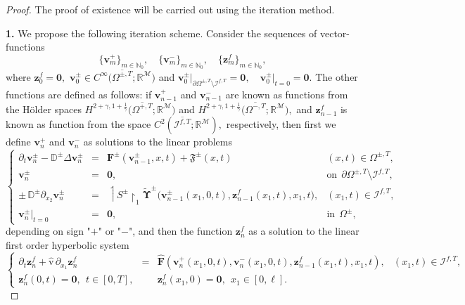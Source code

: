 \documentclass[reqno]{amsart}            %
\numberwithin{equation}{section}
\begin{document}
	
	\begin{proof}
		The proof of existence will be carried out using the iteration method.
		
		{\bf 1.} We propose the following iteration scheme. Consider the sequences of vector-functions
		\begin{equation}\label{sequences}
			\{\mathbf{v}^+_m\}_{m\in \mathbb N_0}, \quad \{\mathbf{v}^-_m\}_{m\in \mathbb N_0}, \quad \{\mathbf{z}^f_m\}_{m\in \mathbb N_0}, 
		\end{equation}   
		where $\mathbf{z}^f_0 = \mathbf{0},$ $\mathbf{v}^\pm_0 \in C^\infty\big(\overline{\Omega^{\pm, T}}; \mathbb{R}^\mathcal{M}\big)$ and 
		$
		\mathbf{v}^\pm_0\big|_{\partial\Omega^{\pm, T}\setminus \mathcal{I}^{f,T}} = \mathbf{0}, \quad 
		\mathbf{v}^\pm_0\big|_{t=0} = \mathbf{0}.
		$
		The other functions are defined as follows: if $\mathbf{v}^+_{n-1}$ and $\mathbf{v}^-_{n-1}$ are known as functions from the H\"older spaces
		$H^{2+\gamma,1 + \frac{1}{\gamma}}\big(\overline{\Omega^{+,T}}; \mathbb{R}^\mathcal{M}\big)$  and $H^{2+\gamma,1 + \frac{1}{\gamma}}\big(\overline{\Omega^{-,T}}; \mathbb{R}^\mathcal{M}\big),$ and $\mathbf{z}^f_{n-1}$ is known as function from the space
		$C^2(\overline{\mathcal{I}^{f, T}}; \mathbb{R}^\mathcal{M}),$
		respectively, then first we define $\mathbf{v}^+_{n}$ and $\mathbf{v}^-_{n}$ as solutions to the linear problems
		\begin{equation}\label{recur-prob-1}
			\left\{\begin{array}{rcll}
				\partial_t \mathbf{v}^\pm_n -   \mathbb{D}^\pm \Delta \mathbf{v}^\pm_n
				& = & \mathbf{F}^\pm(\mathbf{v}^\pm_{n-1}, x, t) + \boldsymbol{\mathfrak{F}}^\pm(x,t) & (x,t) \in \Omega^{\pm, T} ,
				\\[2mm]
				\mathbf{v}^\pm_n  & = & \mathbf{0}, & \text{on} \ \ \partial\Omega^{\pm, T}  \setminus \mathcal{I}^{f,T},
				\\[2mm]
				\pm\, \mathbb{D}^\pm \partial_{x_2} \mathbf{v}^\pm_n &=& 
				\upharpoonleft\!\! {S}^\pm\!\!\upharpoonright_1\widetilde{\boldsymbol{\Upsilon}}^\pm\big(\mathbf{v}^\pm_{n-1}(x_1,0,t), \mathbf{z}^f_{n-1}(x_1,t), x_1, t \big), & (x_1, t) \in \mathcal{I}^{f,T},
				\\[2mm]
				\mathbf{v}^\pm_{n} \big|_{t=0} & = & \mathbf{0}, & \text{in} \ \ \Omega^\pm ,
			\end{array}\right.
		\end{equation}
		depending on sign "$+$" or "$-$",  
		and then the function $\mathbf{z}^f_{n}$ as a solution to the linear first order hyperbolic system
		\begin{equation}\label{recur-prob-2}
			\left\{\begin{array}{rcll}
				\partial_t \mathbf{z}^f_n  + \hat{\mathrm{v}} \, \partial_{x_1} \mathbf{z}^f_n & =& \widehat{ \mathbf {F}}(\mathbf{v}^+_n(x_1,0,t), \mathbf{v}^-_n(x_1,0,t), \mathbf{z}^f_{n-1}(x_1,t), x_1, t), &
				(x_1,t) \in \mathcal{I}^{f, T},
				\\[3pt]
				\mathbf{z}^f_n(0,t)= \mathbf{0}, \ \ t\in [0,T], & & \mathbf{z}^f_n(x_1,0)= \mathbf{0}, \ \ x_1\in [0, \ell].
			\end{array}\right.
		\end{equation}
		

\end{proof}
\end{document}

